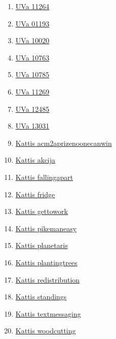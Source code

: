 \begin{enumerate}
\item \href{https://onlinejudge.org/index.php?option=com_onlinejudge&Itemid=8&page=show_problem&problem=2231}{UVa 11264}
\item \href{https://onlinejudge.org/index.php?option=com_onlinejudge&Itemid=8&page=show_problem&problem=3634}{UVa 01193}
\item \href{https://onlinejudge.org/index.php?option=com_onlinejudge&Itemid=8&page=show_problem&problem=961}{UVa 10020}
\item \href{https://onlinejudge.org/index.php?option=com_onlinejudge&Itemid=8&page=show_problem&problem=1704}{UVa 10763}
\item \href{https://onlinejudge.org/index.php?option=com_onlinejudge&Itemid=8&page=show_problem&problem=1726}{UVa 10785}
\item \href{https://onlinejudge.org/index.php?option=com_onlinejudge&Itemid=8&page=show_problem&problem=2236}{UVa 11269}
\item \href{https://onlinejudge.org/index.php?option=com_onlinejudge&Itemid=8&page=show_problem&problem=3929}{UVa 12485}
\item \href{https://onlinejudge.org/index.php?option=com_onlinejudge&Itemid=8&page=show_problem&problem=4919}{UVa 13031}
\item \href{https://open.kattis.com/problems/acm2aprizenoonecanwin}{Kattis acm2aprizenoonecanwin}
\item \href{https://open.kattis.com/problems/akcija}{Kattis akcija}
\item \href{https://open.kattis.com/problems/fallingapart}{Kattis fallingapart}
\item \href{https://open.kattis.com/problems/fridge}{Kattis fridge}
\item \href{https://open.kattis.com/problems/gettowork}{Kattis gettowork}
\item \href{https://open.kattis.com/problems/pikemaneasy}{Kattis pikemaneasy}
\item \href{https://open.kattis.com/problems/planetaris}{Kattis planetaris}
\item \href{https://open.kattis.com/problems/plantingtrees}{Kattis plantingtrees}
\item \href{https://open.kattis.com/problems/redistribution}{Kattis redistribution}
\item \href{https://open.kattis.com/problems/standings}{Kattis standings}
\item \href{https://open.kattis.com/problems/textmessaging}{Kattis textmessaging}
\item \href{https://open.kattis.com/problems/woodcutting}{Kattis woodcutting}

\end{enumerate}
